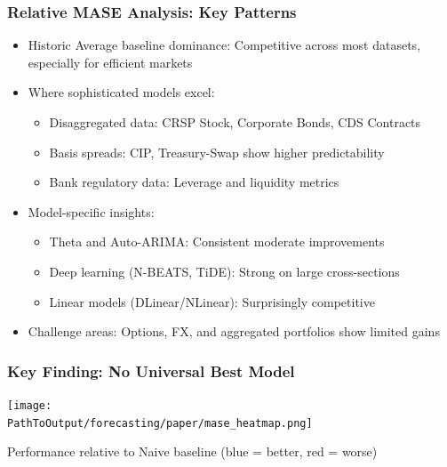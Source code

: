 \documentclass[ignorenonframetext, 9pt]{beamer}
\begin{document}
\begin{frame}
  \frametitle{Relative MASE Analysis: Key Patterns}
  \begin{itemize}
  \item \alert{Historic Average baseline dominance:} Competitive across most datasets, especially for efficient markets
  \vspace{0.3cm}
  \item \alert{Where sophisticated models excel:}
  \begin{itemize}
    \item Disaggregated data: CRSP Stock, Corporate Bonds, CDS Contracts
    \item Basis spreads: CIP, Treasury-Swap show higher predictability
    \item Bank regulatory data: Leverage and liquidity metrics
  \end{itemize}
  \vspace{0.3cm}
  \item \alert{Model-specific insights:}
  \begin{itemize}
    \item Theta and Auto-ARIMA: Consistent moderate improvements
    \item Deep learning (N-BEATS, TiDE): Strong on large cross-sections
    \item Linear models (DLinear/NLinear): Surprisingly competitive
  \end{itemize}
  \vspace{0.3cm}
  \item \alert{Challenge areas:} Options, FX, and aggregated portfolios show limited gains
  \end{itemize}
\end{frame}

\begin{frame}
  \frametitle{Key Finding: No Universal Best Model}
  \centering
  \texttt{[image: \\PathToOutput/forecasting/paper/mase\_heatmap.png]}
  \vspace{0.2cm}

  Performance relative to Naive baseline (blue = better, red = worse)
\end{frame}
\end{document}
